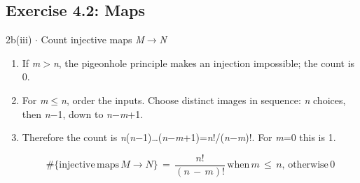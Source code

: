 \documentclass[11pt]{article}
\begin{document}
\begin{keepsection}\subsection{Exercise 4.2: Maps}

\begin{workedbox}{2b(iii) \ensuremath{\cdot} Count injective maps \textit{M}\ensuremath{\to}\textit{N}}
\begin{enumerate}
\item If \textit{m}\ensuremath{>}\textit{n}, the pigeonhole principle makes an injection impossible; the count is 0.
\item For \textit{m}\ensuremath{\leq}\textit{n}, order the inputs. Choose distinct images in sequence: \textit{n} choices, then \textit{n}\ensuremath{-}1, down to \textit{n}\ensuremath{-}\textit{m}+1.
\item {}
Therefore the count is \textit{n}(\textit{n}\ensuremath{-}1)…(\textit{n}\ensuremath{-}\textit{m}+1)=\textit{n}!/(\textit{n}\ensuremath{-}\textit{m})!. For \textit{m}=0 this is 1.

\begin{equation*}\#\{\text{injective}\, \text{maps}\, {M}\to {N}\}\, =\, \dfrac{{n}!}{({n}\, -\, {m})!}\, \text{when}\, {m}\, \leq \, {n},\, \text{otherwise}\, 0\end{equation*}
\end{enumerate}
\end{workedbox}

\end{keepsection}
\end{document}
